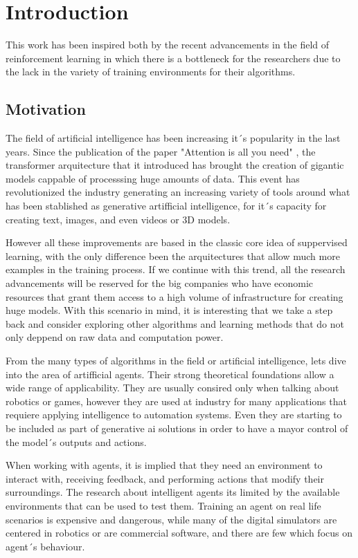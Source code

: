 \chapter{Introduction}

This work has been inspired both by the recent advancements in the field of reinforcement learning in which there is a bottleneck for the researchers due to the lack in the variety of training environments for their algorithms. 

\section{Motivation}

The field of artificial intelligence has been increasing it´s popularity in the last years. Since the publication of the paper "Attention is all you need" \cite{attention}, the transformer arquitecture that it introduced has brought the creation of gigantic models cappable of processsing huge amounts of data. This event has revolutionized the industry generating an increasing variety of tools around what has been stablished as generative artifficial intelligence, for it´s capacity for creating text, images, and even videos or 3D models.

However all these improvements are based in the classic core idea of suppervised learning, with the only difference been the arquitectures that allow much more examples in the training process. If we continue with this trend, all the research advancements will be reserved for the big companies who have economic resources that grant them access to a high volume of infrastructure for creating huge models. With this scenario in mind, it is interesting that we take a step back and consider exploring other algorithms and learning methods that do not only deppend on raw data and computation power.

From the many types of algorithms in the field or artificial intelligence, lets dive into the area of artifficial agents. Their strong theoretical foundations allow a wide range of applicability. They are usually consired only when talking about robotics or games, however they are used at industry for many applications that requiere applying intelligence to automation systems. Even they are starting to be included as part of generative ai solutions in order to have a mayor control of the model´s outputs and actions.

When working with agents, it is implied that they need an environment to interact with, receiving feedback, and performing actions that modify their surroundings. The research about intelligent agents its limited by the available environments that can be used to test them. Training an agent on real life scenarios is expensive and dangerous, while many of the digital simulators are centered in robotics or are commercial software, and there are few which focus on agent´s behaviour.

